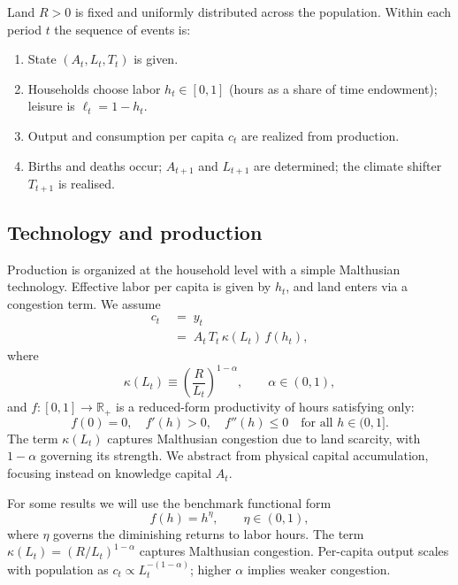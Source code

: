 \documentclass[11pt,a4paper]{article}
\begin{document}
Land \(R>0\) is fixed and uniformly distributed across the population. Within each period \(t\) the sequence of events is:
\begin{enumerate}
  \item State \((A_t,L_t,T_t)\) is given.
  \item Households choose labor \(h_t\in[0,1]\) (hours as a share of time endowment); leisure is \(\ell_t=1-h_t\).
  \item Output and consumption per capita \(c_t\) are realized from production.
  \item Births and deaths occur; \(A_{t+1}\) and \(L_{t+1}\) are determined; the climate shifter \(T_{t+1}\) is realised.
\end{enumerate}

\subsection*{Technology and production}

Production is organized at the household level with a simple Malthusian technology. Effective labor per capita is given by \(h_t\), and land enters via a congestion term. We assume
\begin{equation}
  \begin{split}
    c_t &\;=\; y_t \\
    &\;=\; A_t\,T_t\,\kappa(L_t)\,f(h_t),
  \end{split}
  \label{eq:prod_def}
\end{equation}
where
\[
  \kappa(L_t) \equiv \left(\frac{R}{L_t}\right)^{1-\alpha},
  \qquad
  \alpha\in(0,1),
\]
and \(f:[0,1]\to\mathbb{R}_+\) is a reduced-form productivity of hours satisfying only:
\begin{equation}
  f(0)=0,\quad f'(h)>0,\quad f''(h)\le 0\quad\text{for all }h\in(0,1].
  \label{eq:F_assumptions}
\end{equation}
The term \(\kappa(L_t)\) captures Malthusian congestion due to land scarcity, with \(1-\alpha\) governing its strength. We abstract from physical capital accumulation, focusing instead on knowledge capital \(A_t\).

For some results we will use the benchmark functional form
\begin{equation}
  f(h) = h^\eta,\qquad \eta\in(0,1),
  \label{eq:f_power}
\end{equation}
where \(\eta\) governs the diminishing returns to labor hours. The term \(\kappa(L_t) = (R/L_t)^{1-\alpha}\) captures Malthusian congestion. Per-capita output scales with population as \(c_t \propto L_t^{-(1-\alpha)}\); higher \(\alpha\) implies weaker congestion.
\end{document}
